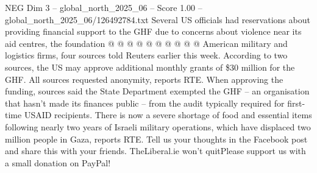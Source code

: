 \begin{textsample}{NEG Dim 3 – global\_north\_2025\_06 – Score 1.00 – global\_north\_2025\_06/126492784.txt}
Several US officials had reservations about providing financial support to the GHF due to concerns about violence near its aid centres, the foundation @ @ @ @ @ @ @ @ @ @ American military and logistics firms, four sources told Reuters earlier this week.
According to two sources, the US may approve additional monthly grants of \$30 million for the GHF.
All sources requested anonymity, reports RTE.
When approving the funding, sources said the State Department exempted the GHF -- an organisation that hasn't made its finances public -- from the audit typically required for first-time USAID recipients.
There is now a severe shortage of food and essential items following nearly two years of Israeli military operations, which have displaced two million people in Gaza, reports RTE.
Tell us your thoughts in the Facebook post and share this with your friends.
TheLiberal.ie won't quitPlease support us with a small donation on PayPal!

\end{textsample}
